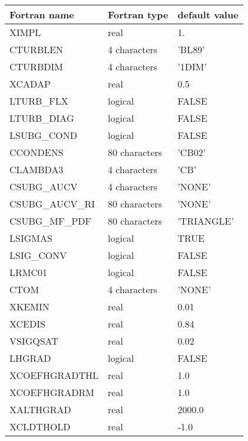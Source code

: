 \begin{longtable} {|p{}|p{}|p{}|}
\hline
Fortran name &  Fortran type & default value \\
\hline 
\endhead
\hline
\endfoot
XIMPL       &  real          & 1.     \\
CTURBLEN    &  4 characters  & 'BL89'   \\
CTURBDIM    &  4 characters  & '1DIM'   \\
XCADAP      & real           & 0.5 \\
LTURB\_FLX  &  logical       & FALSE  \\
LTURB\_DIAG &  logical       & FALSE  \\
LSUBG\_COND &  logical       & FALSE  \\
CCONDENS    &  80 characters  & 'CB02' \\
CLAMBDA3    &  4 characters  & 'CB' \\
CSUBG\_AUCV &  4 characters  & 'NONE' \\
CSUBG\_AUCV\_RI &  80 characters  & 'NONE' \\
CSUBG\_MF\_PDF  &  80 characters  & 'TRIANGLE' \\
LSIGMAS     &  logical       & TRUE   \\
LSIG\_CONV  &  logical       & FALSE   \\
LRMC01      &  logical       & FALSE  \\
CTOM        &  4 characters  & 'NONE'   \\
XKEMIN      &  real          & 0.01 \\
XCEDIS      &  real          & 0.84 \\
VSIGQSAT    & real           & 0.02 \\
LHGRAD      & logical        & FALSE \\
XCOEFHGRADTHL & real         & 1.0   \\
XCOEFHGRADRM  & real         & 1.0   \\
XALTHGRAD     & real         & 2000.0 \\
XCLDTHOLD     & real         & -1.0   \\
\end{longtable}

